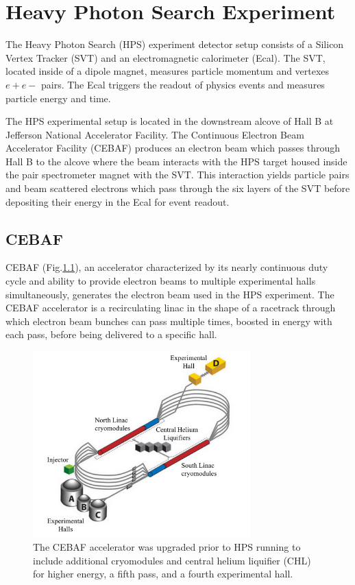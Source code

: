 \documentclass[12pt]{report}
\begin{document}
\chapter{Heavy Photon Search Experiment}
The Heavy Photon Search (HPS) experiment detector setup consists of a Silicon Vertex Tracker (SVT) and an electromagnetic calorimeter (Ecal). The SVT, located inside of a dipole magnet, measures particle momentum and vertexes $e+e-$ pairs. The Ecal triggers the readout of physics events and measures particle energy and time. \par
The HPS experimental setup is located in the downstream alcove of Hall B at Jefferson National Accelerator Facility. The Continuous Electron Beam Accelerator Facility (CEBAF) produces an electron beam which passes through Hall B to the alcove where the beam interacts with the HPS target housed inside the pair spectrometer magnet with the SVT. This interaction yields particle pairs and beam scattered electrons which pass through the six layers of the SVT before depositing their energy in the Ecal for event readout.

\section{CEBAF}

CEBAF (Fig.\ref{Figure:cebaf}), an accelerator characterized by its nearly continuous duty cycle and ability to provide electron beams to multiple experimental halls simultaneously, generates the electron beam used in the HPS experiment. The CEBAF accelerator is a recirculating linac in the shape of a racetrack through which electron beam bunches can pass multiple times, boosted in energy with each pass, before being delivered to a specific hall. 

\begin{figure}[H]
  \centering
      \includegraphics[width=0.75\textwidth]{pics/experiment/cebafLabel.png}
  \caption[CEBAF accelerator]{The CEBAF accelerator was upgraded prior to HPS running to include additional cryomodules and central helium liquifier (CHL) for higher energy, a fifth pass, and a fourth experimental hall.}
  \label{Figure:cebaf}
\end{figure}
\end{document}
